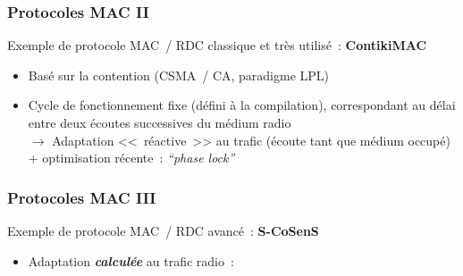 \documentclass[10pt,c]{beamer}
\newcommand{\lang}[1]{\textit{#1}}
\newcommand{\nom}[1]{\textbf{#1}}
\renewcommand{\emph}[1]{\textbf{\textit{#1}}}
\begin{document}
\begin{frame}[label=protoMACRDC2]
\frametitle{Protocoles MAC II}

Exemple de protocole MAC~/ RDC classique et très utilisé~: \nom{ContikiMAC}


\begin{itemize}
\item Basé sur la contention (CSMA~/ CA, paradigme LPL)
\item Cycle de fonctionnement fixe (défini à la compilation),
correspondant au délai entre deux écoutes successives du médium radio \\ 
$\rightarrow$ Adaptation <<~réactive~>> au trafic {\small(écoute tant que
médium occupé)} \\
+ optimisation récente~: \lang{``phase lock''}
\end{itemize}

\end{frame}

\begin{frame}[label=protoMACRDC3]
\frametitle{Protocoles MAC III}

\vspace{-0.25cm}

Exemple de protocole MAC~/ RDC avancé~: \nom{S-CoSenS}

\begin{itemize}
\item Adaptation \emph{calculée} au trafic radio~:
\end{itemize}


\end{frame}
\end{document}
